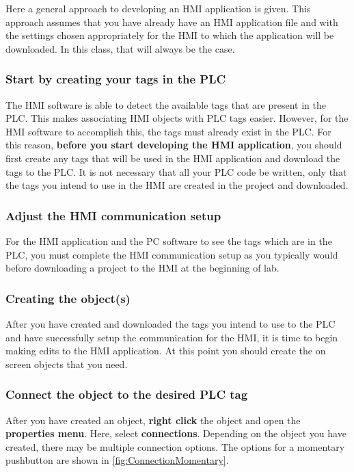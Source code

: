 Here a general approach to developing an HMI application is given. This approach assumes that you have already have an HMI application file and with the settings chosen appropriately for the HMI to which the application will be downloaded. In this class, that will always be the case.

\subsubsection{Start by creating your tags in the PLC}
The HMI software is able to detect the available tags that are present in the PLC. This makes associating HMI objects with PLC tags easier. However, for the HMI software to accomplish this, the tags must already exist in the PLC. For this reason, \textbf{before you start developing the HMI application}, you should first create any tags that will be used in the HMI application and download the tags to the PLC. It is not necessary that all your PLC code be written, only that the tags you intend to use in the HMI are created in the project and downloaded.


\subsubsection{Adjust the HMI communication setup}
For the HMI application and the PC software to see the tags which are in the PLC, you must complete the HMI communication setup as you typically would before downloading a project to the HMI at the beginning of lab. 


\subsubsection{Creating the object(s)}
After you have created and downloaded the tags you intend to use to the PLC and have successfully setup the communication for the HMI, it is time to begin making edits to the HMI application. At this point you should create the on screen objects that you need. 

\subsubsection{Connect the object to the desired PLC tag}
After you have created an object, \textbf{right click} the object and open the \textbf{properties menu}. Here, select \textbf{connections}. Depending on the object you have created, there may be multiple connection options. The options for a momentary pushbutton are shown in \figureautorefname \ref{fig:ConnectionMomentary}. 


